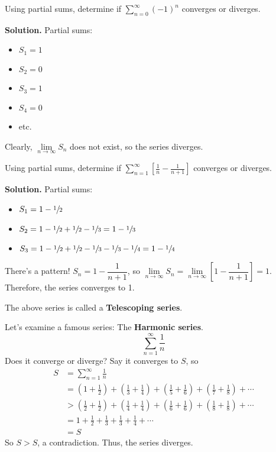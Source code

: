 \begin{Example}{}{}
    Using partial sums, determine if $ \displaystyle \sum_{n=0}^{\infty}(-1)^n $ converges
    or diverges.

    \textbf{Solution.} Partial sums:
    \begin{itemize}
        \item $ S_1=1 $
        \item $ S_2=0 $
        \item $ S_3=1 $
        \item $ S_4=0 $
        \item etc.
    \end{itemize}
    Clearly, $ \lim\limits_{{n} \to {\infty}} S_n $ does not exist, so
    the series diverges.
\end{Example}

\begin{Example}{}{}
    Using partial sums, determine if $ \displaystyle
        \sum\limits_{n=1}^{\infty} \left[\frac{1}{n} -\frac{1}{n+1}\right] $ converges
    or diverges.

    \textbf{Solution.} Partial sums:
    \begin{itemize}
        \item $ S_1=1-\sfrac{1}{2} $
        \item $ S_2=1-\sfrac{1}{2} +\sfrac{1}{2}-\sfrac{1}{3}=1-\sfrac{1}{3} $
        \item $ S_3=1-\sfrac{1}{2} +\sfrac{1}{2} -\sfrac{1}{3} -\sfrac{1}{3} -\sfrac{1}{4}=1-\sfrac{1}{4} $
    \end{itemize}
    There's a pattern! $ S_n=1-\dfrac{1}{n+1} $, so $
        \lim\limits_{{n} \to {\infty}} S_n=
        \lim\limits_{{n} \to {\infty}} \left[1-\dfrac{1}{n+1}\right]=1 $. Therefore, the series
    converges to 1.
\end{Example}

\begin{Remark}{}{}
    The above series is called a \textbf{Telescoping series}.
\end{Remark}

Let's examine a famous series: The \textbf{Harmonic series}.
\[ \sum\limits_{n=1}^{\infty}\frac{1}{n} \]
Does it converge or diverge? Say it converges to $ S $, so
\begin{align*}
    S
     & =\sum\limits_{n=1}^{\infty} \frac{1}{n}                                              \\
     & =\left( 1+\frac{1}{2} \right)+\left( \frac{1}{3} +\frac{1}{4} \right)+
    \left( \frac{1}{5} +\frac{1}{6} \right)+\left( \frac{1}{7} +\frac{1}{8}  \right)+\cdots \\
     & >\left( \frac{1}{2} +\frac{1}{2}  \right)+\left( \frac{1}{4}+\frac{1}{4}  \right) +
    \left( \frac{1}{6}+\frac{1}{6} \right)+\left( \frac{1}{8} +\frac{1}{8}  \right)+\cdots  \\
     & =1+\frac{1}{2} +\frac{1}{3} +\frac{1}{3} +\frac{1}{4} +\cdots                        \\
     & =S
\end{align*}
So $ S>S $, a contradiction. Thus, the series diverges.

